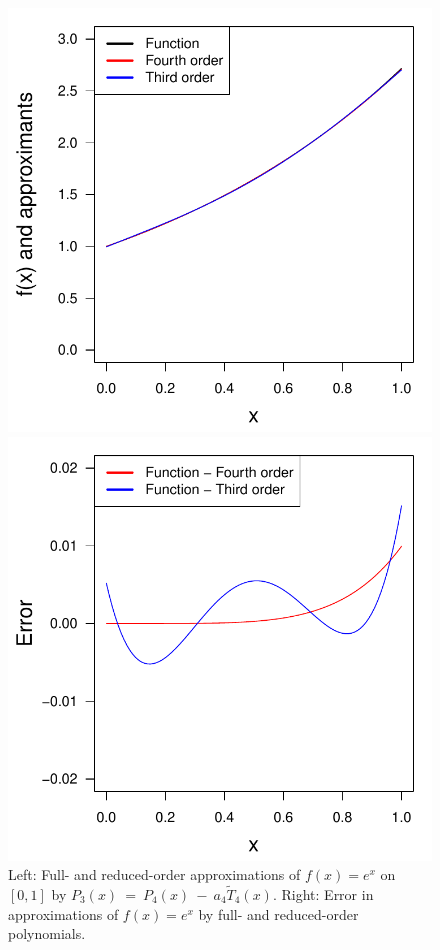 \documentclass[11pt]{article}
\begin{document}
\begin{figure}[ht!]\centering
\begin{minipage}{0.48\textwidth}
\includegraphics[width=\textwidth]{3_approximation/cheb_order_lagr.pdf}

\end{minipage}
\begin{minipage}{0.48\textwidth}

\includegraphics[width=\textwidth]{3_approximation/cheb_order_lagr_err.pdf}
\end{minipage}
\caption{Left: Full- and reduced-order approximations of \(f(x) = e^x\) on \([0, 1]\) by \(P_3(x)~=~P_4(x)~-~a_4 \tilde T_4(x)\). Right: Error in approximations of \(f(x) = e^x\) by full- and reduced-order polynomials.}\label{fig::cheb_ord}
\end{figure}
\end{document}
